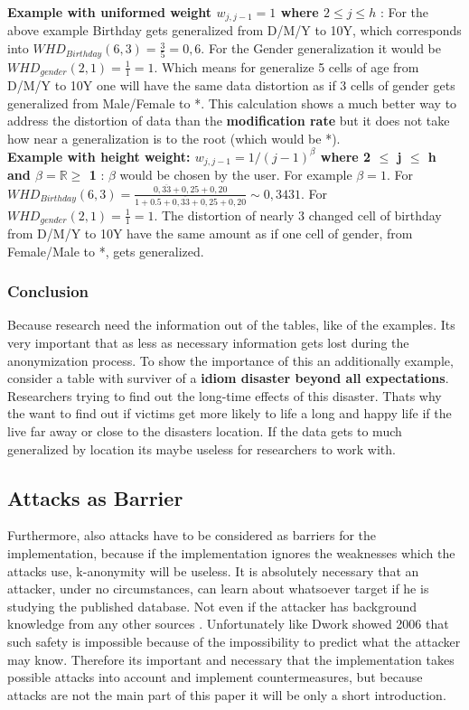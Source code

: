 \documentclass{llncs}
\newcommand{\R}{\mathbb{R}}
\begin{document}
\textbf{Example with uniformed weight $w_{j,j-1} = 1$ where $2\leq j \leq h$} \cite{li2006achieving}: For the above example Birthday gets generalized from D/M/Y to 10Y, which corresponds into $WHD_{Birthday}(6,3) = \frac{3}{5} = 0,6$. For the Gender generalization it would be $WHD_{gender}(2,1) = \frac{1}{1} = 1$. Which means for generalize 5 cells of age from D/M/Y to 10Y one will have the same data distortion as if 3 cells of gender gets generalized from Male/Female to *. This calculation shows a much better way to address the distortion of data than the \textbf{modification rate} but it does not take how near a generalization is to the root (which would be *).\\

\textbf{Example with height weight: $w_{j,j-1} = 1 / (j-1)^{\beta}$ where 2 $\leq$ j $\leq$ h and $\beta = \R \geq$ 1} \cite{li2006achieving}:
$\beta$ would be chosen by the user. For example $\beta = 1$. For $WHD_{Birthday}(6,3) = \frac{0,\overline{33}+0,25+0,20}{1+0.5+0,\overline{33}+0,25+0,20} \sim 0,3431$. For $WHD_{gender}(2,1) = \frac{1}{1} = 1$. The distortion of nearly 3 changed cell of birthday from D/M/Y to  10Y have the same amount as if one cell of gender, from Female/Male to *, gets generalized. 

\subsubsection{Conclusion}

Because research need the information out of the tables, like of the examples. Its very important that as less as necessary information gets lost during the anonymization process. To show the importance  of this an additionally example, consider a table with surviver of a \textbf{idiom disaster beyond all expectations}. Researchers trying to find out the long-time effects of this disaster. Thats why the want to find out if victims get more likely to life a long and happy life if the live far away or close to the disasters location. If the data gets to much generalized by location its maybe useless for researchers to work with.

\subsection{Attacks as Barrier}

Furthermore, also attacks have to be considered as barriers for the implementation, because if the implementation ignores the weaknesses which the attacks use, k-anonymity will be useless. 
It is absolutely necessary that an attacker, under no circumstances, can learn about whatsoever target if he is studying the published database. Not even if the attacker has background knowledge from any other sources  \cite{Dalenius1977}. Unfortunately like Dwork showed 2006 that such safety is impossible because of the impossibility to predict what the attacker may know. Therefore its important and necessary that the implementation takes possible attacks into account and implement countermeasures, but because attacks are not the main part of this paper it will be only a short introduction. 
\end{document}
